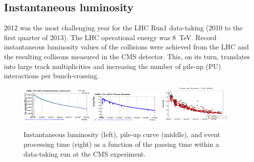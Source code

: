 \documentclass[a4paper]{jpconf}
\begin{document}
\subsection{Instantaneous luminosity}

2012 was the most challenging year for the LHC Run1 data-taking (2010 to the first quarter of 2013). The LHC operational energy was 8~TeV. Record instantaneous luminosity values of the collisions were achieved from the LHC and the resulting collisons measured in the CMS detector. This, on its turn, translates into large track multiplicities and increasing the number of pile-up (PU) interactions per bunch-crossing.

\begin{figure}[ht]
  \begin{center}
\includegraphics[width=0.32\textwidth,height=0.34\textwidth]{6.pdf}
\includegraphics[width=0.32\textwidth,height=0.34\textwidth]{5.pdf}
\includegraphics[width=0.32\textwidth,height=0.34\textwidth]{7.pdf}
\caption{\label{fig2} Instantaneous luminosity (left), pile-up curve (middle), and event processing time (right) as a function of the passing time within a data-taking run at the CMS experiment.}
  \end{center}
\vspace{-7mm}
\end{figure}
\end{document}
